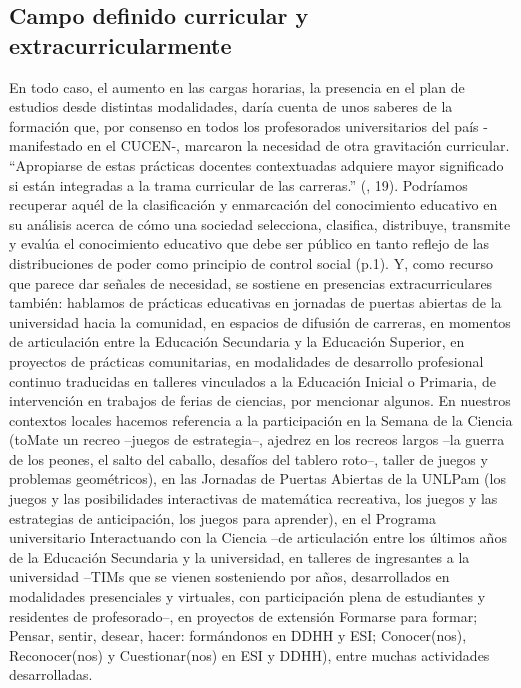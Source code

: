 \documentclass[oneside,spanish]{amsart}
\numberwithin{equation}{section}
\numberwithin{figure}{section}
\theoremstyle{definition}
\begin{document}
\subsection{Campo definido curricular y extracurricularmente}

En todo caso, el aumento en las cargas horarias, la presencia en el plan de estudios desde distintas modalidades, daría cuenta de unos saberes de la formación que, por consenso en todos los profesorados universitarios del país -manifestado en el CUCEN-, marcaron la necesidad de otra gravitación curricular. “Apropiarse de estas prácticas docentes contextuadas adquiere mayor significado si están integradas a la trama curricular de las carreras.” (\cite{lapasta18}, 19). Podríamos recuperar aquél \cite{bernstein89} de la clasificación y enmarcación del conocimiento educativo en su análisis acerca de cómo una sociedad selecciona, clasifica, distribuye, transmite y evalúa el conocimiento educativo que debe ser público en tanto reflejo de las distribuciones de poder como principio de control social (p.1). Y, como recurso que parece dar señales de necesidad, se sostiene en presencias extracurriculares también: hablamos de prácticas educativas en jornadas de puertas abiertas de la universidad hacia la comunidad, en espacios de difusión de carreras, en momentos de articulación entre la Educación Secundaria y la Educación Superior, en proyectos de prácticas comunitarias, en modalidades de desarrollo profesional continuo traducidas en talleres vinculados a la Educación Inicial o Primaria, de intervención en trabajos de ferias de ciencias, por mencionar algunos. En nuestros contextos locales hacemos referencia a la participación  en la Semana de la Ciencia (toMate un recreo --juegos de estrategia--, ajedrez en los recreos largos –la guerra de los peones, el salto del caballo, desafíos del tablero roto–, taller de juegos y problemas geométricos), en las Jornadas de Puertas Abiertas de la UNLPam (los juegos y las posibilidades interactivas de matemática recreativa, los juegos y las estrategias de anticipación, los juegos para aprender), en el Programa universitario Interactuando con la Ciencia –de articulación entre los últimos años de la Educación Secundaria y la universidad, en talleres de ingresantes a la universidad --TIMs que se vienen sosteniendo por años, desarrollados en modalidades presenciales y virtuales, con participación plena de estudiantes y residentes de profesorado--, en proyectos de extensión Formarse para formar; Pensar, sentir, desear, hacer: formándonos en DDHH y ESI; Conocer(nos), Reconocer(nos) y Cuestionar(nos) en ESI y DDHH), entre muchas actividades desarrolladas. 
\end{document}
